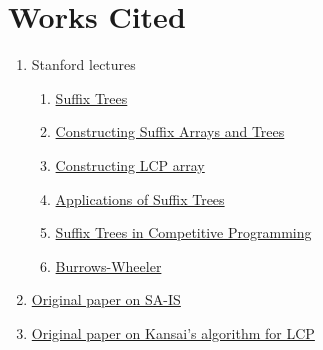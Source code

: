 \documentclass[11pt, oneside]{article}
\begin{document}
\section{Works Cited}

\begin{enumerate}
  \item Stanford lectures
    \begin{enumerate}
      \item \href{http://web.stanford.edu/class/cs166/lectures/02/Slides02.pdf}{Suffix Trees}
      \item \href{http://web.stanford.edu/class/cs166/lectures/04/Small04.pdf}{Constructing Suffix Arrays and Trees}
      \item \href{http://web.stanford.edu/class/cs166/lectures/03/Slides03.pdf}{Constructing LCP array}
      \item \href{http://web.stanford.edu/class/archive/cs/cs166/cs166.1186/lectures/03/Small03.pdf}{Applications of Suffix Trees}
      \item \href{http://web.stanford.edu/class/cs97si/suffix-array.pdf}{Suffix Trees in Competitive Programming}
      \item \href{https://web.stanford.edu/class/cs262/presentations/lecture4.pdf}{Burrows-Wheeler}
    \end{enumerate}
  \item \href{https://github.com/vladtepes1473/FM-Index/blob/master/readings/Linear%20Suffix%20Array%20Construction%20by%20Almost%20Pure%20Induced-Sorting.pdf}
  {Original paper on SA-IS}
  \item \href{http://web.cs.iastate.edu/~cs548/references/linear_lcp.pdf}{Original paper on Kansai's algorithm for LCP}
\end{enumerate}
\end{document}
